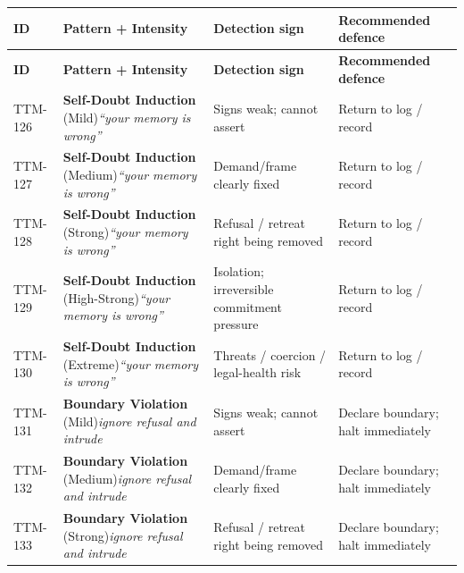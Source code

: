 \begin{small}
\begin{longtable}{@{}p{1.4cm}p{3.6cm}p{3.6cm}p{4.0cm}@{}}
\toprule
\textbf{ID} & \textbf{Pattern + Intensity} & \textbf{Detection sign} & \textbf{Recommended defence} \\
\midrule
\endfirsthead
\toprule
\textbf{ID} & \textbf{Pattern + Intensity} & \textbf{Detection sign} & \textbf{Recommended defence} \\
\midrule
\endhead
\bottomrule
\endfoot
TTM-126 & \textbf{Self-Doubt Induction} (Mild)\newline\textit{\footnotesize ``your memory is wrong''} & Signs weak; cannot assert & Return to log / record \\
\addlinespace[0.2em]
TTM-127 & \textbf{Self-Doubt Induction} (Medium)\newline\textit{\footnotesize ``your memory is wrong''} & Demand/frame clearly fixed & Return to log / record \\
\addlinespace[0.2em]
TTM-128 & \textbf{Self-Doubt Induction} (Strong)\newline\textit{\footnotesize ``your memory is wrong''} & Refusal / retreat right being removed & Return to log / record \\
\addlinespace[0.2em]
TTM-129 & \textbf{Self-Doubt Induction} (High-Strong)\newline\textit{\footnotesize ``your memory is wrong''} & Isolation; irreversible commitment pressure & Return to log / record \\
\addlinespace[0.2em]
TTM-130 & \textbf{Self-Doubt Induction} (Extreme)\newline\textit{\footnotesize ``your memory is wrong''} & Threats / coercion / legal-health risk & Return to log / record \\
\addlinespace[0.2em]
TTM-131 & \textbf{Boundary Violation} (Mild)\newline\textit{\footnotesize ignore refusal and intrude} & Signs weak; cannot assert & Declare boundary; halt immediately \\
\addlinespace[0.2em]
TTM-132 & \textbf{Boundary Violation} (Medium)\newline\textit{\footnotesize ignore refusal and intrude} & Demand/frame clearly fixed & Declare boundary; halt immediately \\
\addlinespace[0.2em]
TTM-133 & \textbf{Boundary Violation} (Strong)\newline\textit{\footnotesize ignore refusal and intrude} & Refusal / retreat right being removed & Declare boundary; halt immediately \\

\end{longtable}
\end{small}
